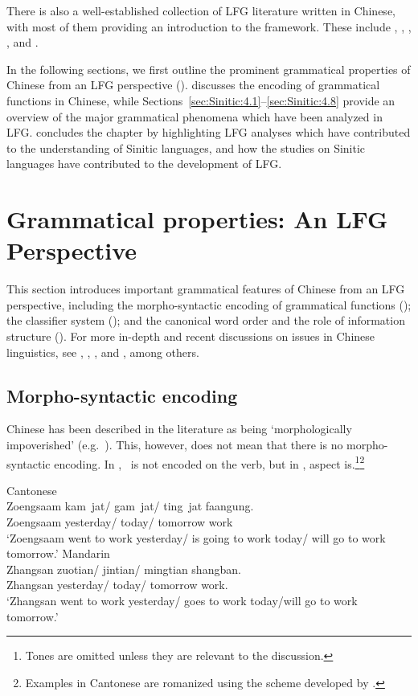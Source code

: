 \documentclass[output=paper,chinesefont,hidelinks]{langscibook}
\begin{document}
There is also a well-established collection of LFG literature written in Chinese, with most of them providing an introduction to the framework. These include \citet{Huang1988,Huang1989a}, \citet{AFu1990a,AFu1990b}, \citet{Fu1993}, \citet{Feng2004}, \citet{GaoFang2009} and \citet{Wei2014}.

In the following sections, we first outline the prominent grammatical properties of Chinese from an LFG perspective ().  discusses the encoding of grammatical functions in Chinese, while Sections~\ref{sec:Sinitic:4.1}--\ref{sec:Sinitic:4.8}  provide an overview of the major grammatical phenomena which have been analyzed in LFG.  concludes the chapter by highlighting LFG analyses which have contributed to the understanding of Sinitic languages, and how the studies on Sinitic languages have contributed to the development of LFG.

\section{Grammatical properties: An LFG Perspective}
\label{sec:Sinitic:2}

This section introduces important grammatical features of Chinese from an LFG perspective, including the morpho-syntactic encoding of grammatical functions (); the classifier system (); and the canonical word order and the role of information structure (). For more in-depth and recent discussions on issues in Chinese linguistics, see \citet{HuangLiLi2009}, \citet{WangSun2015}, \citet{HuangShi2016}, and \citet{HuangLinChenHsu2022}, among others.

\subsection{Morpho-syntactic encoding}
\label{sec:Sinitic:2.1}

Chinese has been described in the literature as being `morphologically impoverished' (e.g.\ \citealt{Packard2000,HsiehHongHuang2022}). This, however, does not mean that there is no morpho-syntactic encoding. In , \TENSE\ is not encoded on the verb, but in , aspect is.\footnote{Tones are omitted unless they are relevant to the discussion.}\footnote{Examples in Cantonese are romanized using the scheme developed by \citet{LSHK2002}.}

\ea%
\ea    \label{ex:Sinitic:1}Cantonese\\
    \gll Zoengsaam    kam~jat/ gam~jat/ ting~jat  faangung.\\
        Zoengsaam  yesterday/ today/ tomorrow  work \\
    \glt `Zoengsaam went to work yesterday/ is going to work today/ will go to work tomorrow.'
    \ex Mandarin\\
    \gll Zhangsan  zuotian/ jintian/ mingtian shangban.\\
    Zhangsan   yesterday/ today/ tomorrow   work.\\
    \glt `Zhangsan went to work yesterday/ goes to work today/will go to work tomorrow.'
    \z\z
\end{document}

